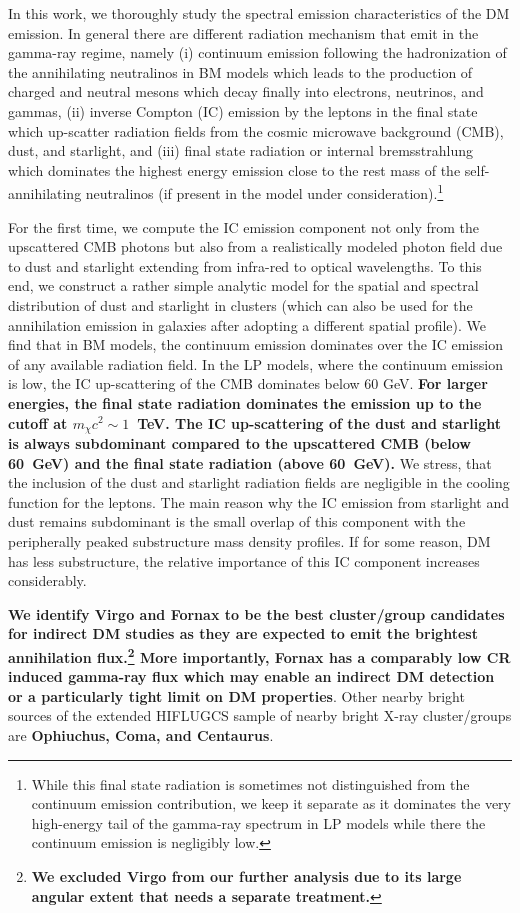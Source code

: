 \documentclass[10pt,aps,pra,reprint,amsmath,amsfonts,amssymb,showpacs,nofootinbib,floatfix]{revtex4-1}
\def\C#1{{\bf #1}}
\begin{document}
In this work, we thoroughly study the spectral emission
characteristics of the DM emission. In general there are different
radiation mechanism that emit in the gamma-ray regime, namely (i)
continuum emission following the hadronization of the annihilating
neutralinos in BM models which leads to the production of charged and
neutral mesons which decay finally into electrons, neutrinos, and
gammas, (ii) inverse Compton (IC) emission by the leptons in the final
state which up-scatter radiation fields from the cosmic microwave
background (CMB), dust, and starlight, and (iii) final state radiation
or internal bremsstrahlung which dominates the highest energy emission
close to the rest mass of the self-annihilating neutralinos (if
present in the model under consideration).\footnote{While this final
  state radiation is sometimes not distinguished from the continuum
  emission contribution, we keep it separate as it dominates the very
  high-energy tail of the gamma-ray spectrum in LP models while there
  the continuum emission is negligibly low.}

For the first time, we compute the IC emission component not only from
the upscattered CMB photons but also from a realistically modeled
photon field due to dust and starlight extending from infra-red to
optical wavelengths. To this end, we construct a rather simple
analytic model for the spatial and spectral distribution of dust and
starlight in clusters (which can also be used for the annihilation
emission in galaxies after adopting a different spatial profile).  We
find that in BM models, the continuum emission dominates over the IC
emission of any available radiation field. In the LP models, where the
continuum emission is low, the IC up-scattering of the CMB dominates
below 60 GeV. \C{For larger energies, the final state radiation
  dominates the emission up to the cutoff at $m_\chi c^2 \sim
  1$~TeV. The IC up-scattering of the dust and starlight is always
  subdominant compared to the upscattered CMB (below 60~GeV) and the
  final state radiation (above 60~GeV).}  We stress, that the
inclusion of the dust and starlight radiation fields are negligible in
the cooling function for the leptons.  The main reason why the IC
emission from starlight and dust remains subdominant is the small
overlap of this component with the peripherally peaked substructure
mass density profiles. If for some reason, DM has less substructure,
the relative importance of this IC component increases considerably.

\C{We identify Virgo and Fornax to be the best cluster/group
  candidates for indirect DM studies as they are expected to emit the
  brightest annihilation flux.\footnote{\C{We excluded Virgo from our
    further analysis due to its large angular extent that needs a
    separate treatment.}}  More importantly, Fornax has a comparably
  low CR induced gamma-ray flux which may enable an indirect DM
  detection or a particularly tight limit on DM properties}.  Other
nearby bright sources of the extended HIFLUGCS sample of nearby bright
X-ray cluster/groups are \C{Ophiuchus, Coma, and Centaurus}.  
\end{document}
